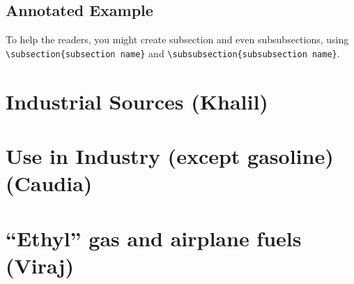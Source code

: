 \documentclass{article}\usepackage[]{graphicx}\usepackage[]{color}
\begin{document}
\subsection{Annotated Example}

\bigskip
\noindent %

\bigskip


To help the readers, you might create subsection and even subsubsections, using \verb!\subsection{subsection name}! and \verb!\subsubsection{subsubsection name}!. 


\section{Industrial Sources (Khalil)}


\section{Use in Industry (except gasoline) (Caudia)}

\section{``Ethyl'' gas and airplane fuels (Viraj)}




\bigskip

\end{document}
